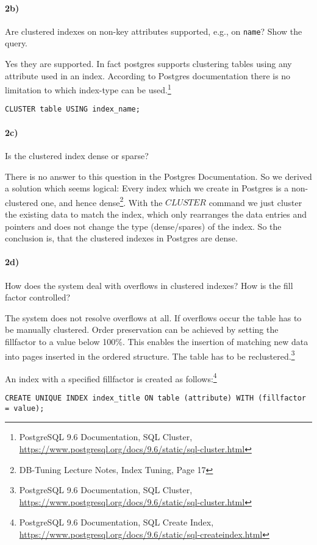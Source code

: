 \documentclass[11pt]{scrartcl}
\begin{document}
\paragraph{2b)} Are clustered indexes on non-key attributes supported, e.g.,
on {\tt name}?  Show the query.

Yes they are supported. In fact postgres supports clustering tables using any attribute used in an index.
According to Postgres documentation there is no limitation to which index-type can be used.\footnote{PostgreSQL 9.6
  Documentation, SQL Cluster,
  \url{https://www.postgresql.org/docs/9.6/static/sql-cluster.html}}

\begin{verbatim}
CLUSTER table USING index_name;
\end{verbatim}


\paragraph{2c)} Is the clustered index dense or sparse?

There is no answer to this question in the Postgres Documentation.
So we derived a solution which seems logical:
Every index which we create in Postgres is a non-clustered one, and hence dense\footnote{DB-Tuning Lecture Notes, Index Tuning, Page 17}. With the $CLUSTER$ command we just cluster the existing data to match the index, which only rearranges the data entries and pointers and does not change the type (dense/spares) of the index. So the conclusion is, that the clustered indexes in Postgres are dense.

\paragraph{2d)} How does the system deal with overflows in clustered indexes?
How is the fill factor controlled?

The system does not resolve overflows at all. If overflows occur the table has to be manually clustered. Order preservation
can be achieved by setting the fillfactor to a value below 100\%. This enables the insertion of matching new data into pages
inserted in the ordered structure. The table has to be reclustered.\footnote{PostgreSQL 9.6
  Documentation, SQL Cluster,
  \url{https://www.postgresql.org/docs/9.6/static/sql-cluster.html}}


An index with a specified fillfactor is created as follows:\footnote{PostgreSQL 9.6
  Documentation, SQL Create Index,
  \url{https://www.postgresql.org/docs/9.6/static/sql-createindex.html}}
\begin{verbatim}
CREATE UNIQUE INDEX index_title ON table (attribute) WITH (fillfactor = value);
\end{verbatim}
\end{document}
